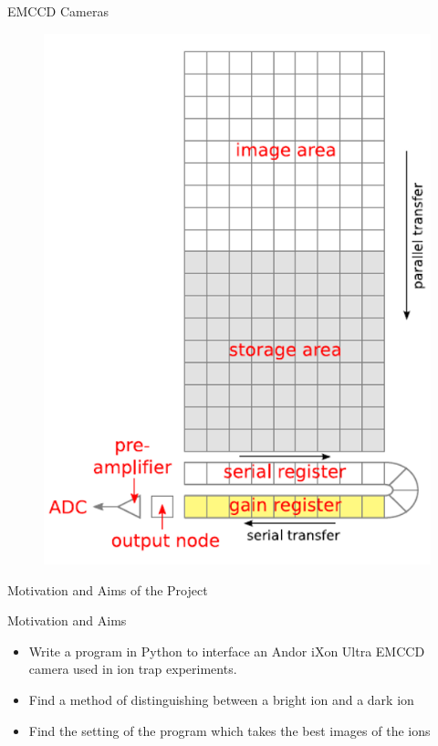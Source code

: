 \documentclass{beamer}
\begin{document}
\begin{frame}{EMCCD Cameras}

\begin{figure}
\centering
\includegraphics[scale=0.4]{Figures/EMCCD_Structure.PNG}
\end{figure}

\end{frame}

\begin{frame}[noframenumbering]

Motivation and Aims of the Project



\end{frame}



\begin{frame}{Motivation and Aims}

\begin{itemize}
\item Write a program in Python to interface an Andor iXon Ultra EMCCD camera used in ion trap
experiments.
\bigskip
\item Find a method of distinguishing between a bright ion and a dark ion
\bigskip
\item Find the setting of the program which takes the best images of the ions
\end{itemize}


\end{frame}
\end{document}
